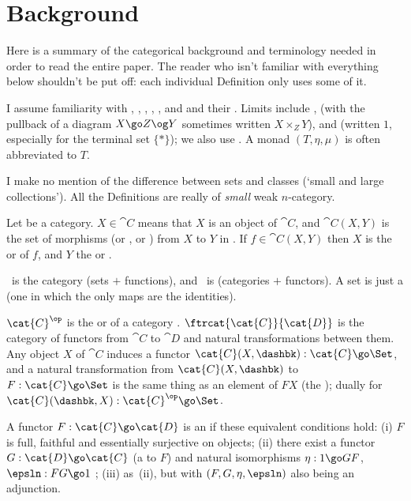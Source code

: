 
\section*{Background}		\label{p:background}



Here is a summary of the categorical background and terminology needed in order
to read the entire paper.  The reader who isn't familiar with everything below
shouldn't be put off: each individual Definition only uses some of it.

I assume familiarity with , ,
, , , and
 and their .  Limits include ,
 (with the pullback of a diagram $X \go Z \og Y$ sometimes
written $X \times_Z Y$), and  (written $1$,
especially for the terminal set $\{ * \}$); we also use
.  A monad $(T,\eta,\mu)$ is often abbreviated to $T$.

I make no mention of the difference between sets and classes (`small
and large collections').  All the Definitions are really of \emph{small}
weak $n$-category.

Let  be a category.  $X\in \cat{C}$ means that $X$ is an object of
$\cat{C}$, and $\cat{C}(X,Y)$ is the set of morphisms (or , or
) from $X$ to $Y$ in .  If $f\in \cat{C}(X,Y)$ then $X$
is the  or  of $f$, and $Y$ the 
or .

\Set\ is the category (sets $+$ functions), and \Cat\ is (categories $+$
functors).  A set is just a  (one in which the only
maps are the identities).

$\cat{C}^\op$ is the  or  of a category
.  $\ftrcat{\cat{C}}{\cat{D}}$ is the category of functors from
$\cat{C}$ to $\cat{D}$ and natural transformations between them.  Any object
$X$ of $\cat{C}$ induces a functor $\cat{C}(X, \dashbk): \cat{C} \go \Set$,
and a natural transformation from $\cat{C}(X, \dashbk)$ to
$F: \cat{C} \go \Set$ is the same thing as an element of $FX$ (the
); dually for $\cat{C}(\dashbk,X): \cat{C}^\op \go \Set$.

A functor $F: \cat{C} \go \cat{D}$ is an  if these
equivalent conditions hold: (i) $F$ is full, faithful and essentially
surjective on objects; (ii) there exist a functor $G: \cat{D} \go \cat{C}$ (a
 to $F$) and natural isomorphisms $\eta: 1 \go GF$,
$\epsln: FG \go 1$ ; (iii) as~(ii), but with $(F,G,\eta,\epsln)$ also being
an adjunction.

